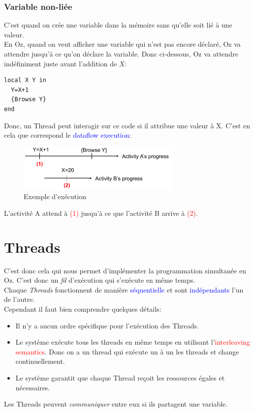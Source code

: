 \documentclass{report}
\begin{document}
\subsubsection{Variable non-liée}
C'est quand on crée une variable dans la mémoire sans qu'elle soit lié à une valeur.\\
En Oz, quand on veut afficher une variable qui n'est pas encore déclaré, Oz va attendre jusqu'à ce qu'on déclare la variable. Donc ci-dessous, Oz va attendre indéfiniment juste avant l'addition de $X$:
\begin{lstlisting}[escapechar=\%]
local X Y in
  Y=X+1
  {Browse Y}
end
\end{lstlisting}
Donc, un Thread peut interagir sur ce code si il attribue une valeur à X. C'est en cela que correspond le \textcolor{blue}{dataflow execution}:
\begin{figure}[H]
\centering
\includegraphics[width=8cm]{img/dataflow.png}
\caption{Exemple d'exécution}
\end{figure}
L'activité A attend à \textcolor{red}{(1)} jusqu'à ce que l'activité B arrive à \textcolor{red}{(2)}.

\section{Threads}
C'est donc cela qui nous permet d'implémenter la programmation simultanée en Oz. C'est donc un \textit{fil} d'exécution qui s'exécute en même temps.\\
Chaque \textit{Threads} fonctionnent de manière \textcolor{blue}{séquentielle} et sont \textcolor{blue}{indépendants} l'un de l'autre.\\
Cependant il faut bien comprendre quelques détails:
\begin{itemize}
\item Il n'y a aucun ordre spécifique pour l'exécution des Threads.
\item Le système exécute tous les threads en même temps en utilisant l'\textcolor{red}{interleaving semantics}. Donc on a un thread qui exécute un à un les threads et change continuellement.
\item Le système garantit que chaque Thread reçoit les ressources égales et nécessaires.
\end{itemize}
Les Threads peuvent \textit{communiquer} entre eux si ils partagent une variable.\\
\end{document}
